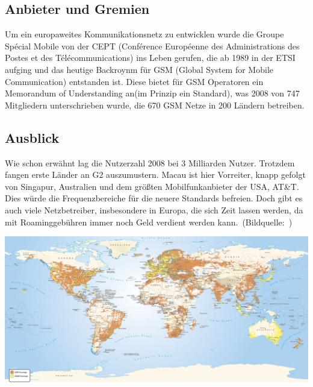 \begin{multicols}{3}

\subsection*{Anbieter und Gremien}
Um ein europaweites Kommunikationsnetz zu entwicklen wurde die Groupe Spécial Mobile von der CEPT (Conférence Européenne des Administrations des Postes et des Télécommunications) ins Leben gerufen, die ab 1989 in der ETSI aufging und das heutige Backroynm für GSM (Global System for Mobile Communication) entstanden ist. Diese bietet für GSM Operatoren ein Memorandum of Understanding an(im Prinzip ein Standard), was 2008 von 747 Mitgliedern unterschrieben wurde, die 670 GSM Netze in 200 Ländern betreiben. \cite{G2.3}	

\subsection*{Ausblick}
Wie schon erwähnt lag die Nutzerzahl 2008 bei 3 Milliarden Nutzer. Trotzdem fangen erste Länder an G2 auszumustern. Macau ist hier Vorreiter, knapp gefolgt von Singapur, Australien und dem größten Mobilfunkanbieter der USA, AT\&T.
Dies würde die Frequenzbereiche für die neuere Standards befreien. Doch gibt es auch viele Netzbetreiber, insbesondere in Europa, die sich Zeit lassen werden, da mit Roaminggebühren immer noch Geld verdient werden kann.\cite{G2.3}~(Bildquelle:~\cite{G2.4})
\printbibliography[segment=6,heading=subbibliography]

\end{multicols}
\begin{Figure}
\includegraphics[width=\textwidth]{Kapitel/G2/Grafiken/GSM-Netzabdeckung-Weltweit.jpg}
\label{fig:G2.global}
\end{Figure}
\newpage
